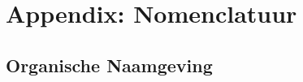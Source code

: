 \onecolumn
\newpage
\section{Appendix: Nomenclatuur}
\label{sec:Nomenclatuur}
  
  
  \newpage
  \subsection{Organische Naamgeving}
  \label{sec:HH:OrganischNaamgeving}
    
    
